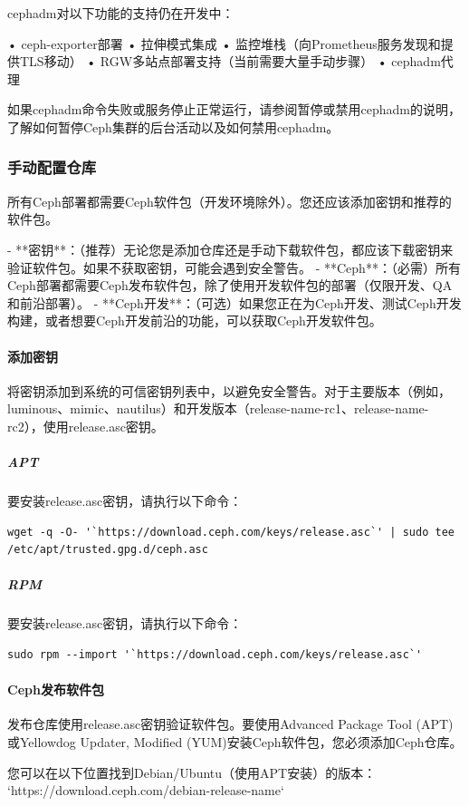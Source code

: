\documentclass[12pt,UTF8]{ctexbook}
\begin{document}
cephadm对以下功能的支持仍在开发中：

• ceph-exporter部署
• 拉伸模式集成
• 监控堆栈（向Prometheus服务发现和提供TLS移动）
• RGW多站点部署支持（当前需要大量手动步骤）
• cephadm代理

如果cephadm命令失败或服务停止正常运行，请参阅暂停或禁用cephadm的说明，了解如何暂停Ceph集群的后台活动以及如何禁用cephadm。

\subsubsection{手动配置仓库}
所有Ceph部署都需要Ceph软件包（开发环境除外）。您还应该添加密钥和推荐的软件包。

- **密钥**：（推荐）无论您是添加仓库还是手动下载软件包，都应该下载密钥来验证软件包。如果不获取密钥，可能会遇到安全警告。
- **Ceph**：（必需）所有Ceph部署都需要Ceph发布软件包，除了使用开发软件包的部署（仅限开发、QA和前沿部署）。
- **Ceph开发**：（可选）如果您正在为Ceph开发、测试Ceph开发构建，或者想要Ceph开发前沿的功能，可以获取Ceph开发软件包。

\paragraph{添加密钥}
将密钥添加到系统的可信密钥列表中，以避免安全警告。对于主要版本（例如，luminous、mimic、nautilus）和开发版本（release-name-rc1、release-name-rc2），使用release.asc密钥。

\subparagraph{APT}
要安装release.asc密钥，请执行以下命令：
\begin{verbatim}
wget -q -O- '`https://download.ceph.com/keys/release.asc`' | sudo tee /etc/apt/trusted.gpg.d/ceph.asc
\end{verbatim}

\subparagraph{RPM}
要安装release.asc密钥，请执行以下命令：
\begin{verbatim}
sudo rpm --import '`https://download.ceph.com/keys/release.asc`'
\end{verbatim}

\paragraph{Ceph发布软件包}
发布仓库使用release.asc密钥验证软件包。要使用Advanced Package Tool (APT)或Yellowdog Updater, Modified (YUM)安装Ceph软件包，您必须添加Ceph仓库。

您可以在以下位置找到Debian/Ubuntu（使用APT安装）的版本：
`https://download.ceph.com/debian-{release-name}`
\end{document}
